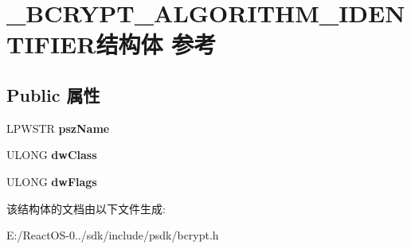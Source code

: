 \hypertarget{struct___b_c_r_y_p_t___a_l_g_o_r_i_t_h_m___i_d_e_n_t_i_f_i_e_r}{}\section{\+\_\+\+B\+C\+R\+Y\+P\+T\+\_\+\+A\+L\+G\+O\+R\+I\+T\+H\+M\+\_\+\+I\+D\+E\+N\+T\+I\+F\+I\+E\+R结构体 参考}
\label{struct___b_c_r_y_p_t___a_l_g_o_r_i_t_h_m___i_d_e_n_t_i_f_i_e_r}
\subsection*{Public 属性}
\begin{DoxyCompactItemize}
\item 
\mbox{\label{struct___b_c_r_y_p_t___a_l_g_o_r_i_t_h_m___i_d_e_n_t_i_f_i_e_r_a91250836b19dee6a30e1da1368ea99a2}} 
L\+P\+W\+S\+TR {\bfseries psz\+Name}
\item 
\mbox{\label{struct___b_c_r_y_p_t___a_l_g_o_r_i_t_h_m___i_d_e_n_t_i_f_i_e_r_a1b4ec1aa7ed902163653d736af02af7e}} 
U\+L\+O\+NG {\bfseries dw\+Class}
\item 
\mbox{\label{struct___b_c_r_y_p_t___a_l_g_o_r_i_t_h_m___i_d_e_n_t_i_f_i_e_r_a32a285d2e92e2875bf3c342b32e12910}} 
U\+L\+O\+NG {\bfseries dw\+Flags}
\end{DoxyCompactItemize}


该结构体的文档由以下文件生成\+:\begin{DoxyCompactItemize}
\item 
E\+:/\+React\+O\+S-\/0../sdk/include/psdk/bcrypt.\+h\end{DoxyCompactItemize}
